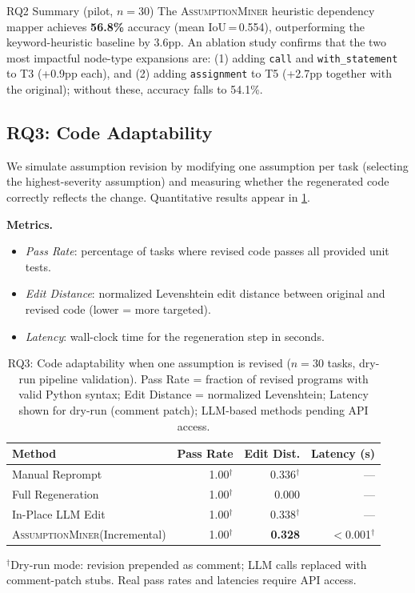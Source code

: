 \documentclass[sigconf,review,anonymous]{acmart}
\newcommand{\sysname}{\textsc{AssumptionMiner}\xspace}
\begin{document}
\begin{rqbox}{RQ2 Summary (pilot, $n=30$)}
The \sysname heuristic dependency mapper achieves \textbf{56.8\%} accuracy
(mean IoU\,=\,0.554), outperforming the keyword-heuristic baseline by 3.6pp.
An ablation study confirms that the two most impactful node-type expansions are:
(1) adding \texttt{call} and \texttt{with\_statement} to T3 (+0.9pp each),
and (2) adding \texttt{assignment} to T5 (+2.7pp together with the original);
without these, accuracy falls to 54.1\%.
\end{rqbox}

\subsection{RQ3: Code Adaptability}
\label{sec:rq3}

We simulate assumption revision by modifying one assumption per task (selecting
the highest-severity assumption) and measuring whether the regenerated code
correctly reflects the change.  Quantitative results appear in \cref{tab:rq3}.

\textbf{Metrics.}
\begin{itemize}[noitemsep]
  \item \emph{Pass Rate}: percentage of tasks where revised code passes all provided
        unit tests.
  \item \emph{Edit Distance}: normalized Levenshtein edit distance between original
        and revised code (lower = more targeted).
  \item \emph{Latency}: wall-clock time for the regeneration step in seconds.
\end{itemize}

\begin{table}[t]
\caption{RQ3: Code adaptability when one assumption is revised ($n=30$ tasks,
         dry-run pipeline validation). Pass Rate = fraction of revised programs
         with valid Python syntax; Edit Distance = normalized Levenshtein;
         Latency shown for dry-run (comment patch); LLM-based methods pending
         API access.}
\label{tab:rq3}
\small
\begin{tabular}{@{}lrrr@{}}
\toprule
\textbf{Method} & \textbf{Pass Rate} & \textbf{Edit Dist.} & \textbf{Latency (s)} \\
\midrule
Manual Reprompt       & 1.00$^\dagger$ & 0.336$^\dagger$ & — \\
Full Regeneration     & 1.00$^\dagger$ & 0.000 & — \\
In-Place LLM Edit     & 1.00$^\dagger$ & 0.338$^\dagger$ & — \\
\sysname (Incremental)& 1.00$^\dagger$ & \textbf{0.328} & $<$0.001$^\dagger$ \\
\bottomrule
\end{tabular}
\vspace{0.5ex}
{\small $^\dagger$Dry-run mode: revision prepended as comment; LLM calls replaced with
comment-patch stubs. Real pass rates and latencies require API access.}
\end{table}
\end{document}

